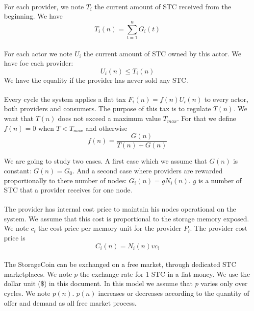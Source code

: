 \documentclass[a4paper,12pt]{article}
\begin{document}
\paragraph*{}
For each provider, we note $T_{i}$ the current amount of STC received from the beginning. We have
\[T_{i}(n)=\sum\limits_{t=1}^n G_{i}(t)\]

\paragraph*{}
For each actor we note $U_{i}$ the current amount of STC owned by this actor. We have foe each provider: 
\[U_{i}(n)\le{T_{i}(n)}\]
We have the equality if the provider has never sold any STC.

\paragraph*{}
Every cycle the system applies a flat tax $F_{i}(n)=f(n)U_{i}(n)$ to every actor, both providers and consumers. The purpose of this tax is to regulate $T(n)$. 
We want that $T(n)$ does not exceed a maximum value $T_{max}$. 
For that we define $f(n)=0$ when $T<T_{max}$ and otherwise \[f(n)=\frac{G(n)}{T(n)+G(n)}\]

We are going to study two cases. 
A first case which we assume that $G(n)$ is constant: $G(n)=G_{0}$. 
And a second case where providers are rewarded proportionally to there number of nodes: $G_{i}(n)=gN_{i}(n)$. 
$g$ is a number of STC that a provider receives for one node.

\paragraph*{}
The provider has internal cost price to maintain his nodes operational on the system. We assume that this cost is proportional to the storage memory exposed. We note $c_{i}$ the cost price per memory unit for the provider $P_{i}$. The provider cost price is
\[C_{i}(n)=N_{i}(n)vc_{i}\]

\paragraph*{}
The StorageCoin can be exchanged on a free market, through dedicated STC marketplaces. We note $p$ the exchange rate for 1 STC in a fiat money. We use the dollar unit (\$) in this document.
In this model we assume that $p$ varies only over cycles. We note $p(n)$.
$p(n)$ increases or decreases according to the quantity of offer and demand as all free market process.
\end{document}
